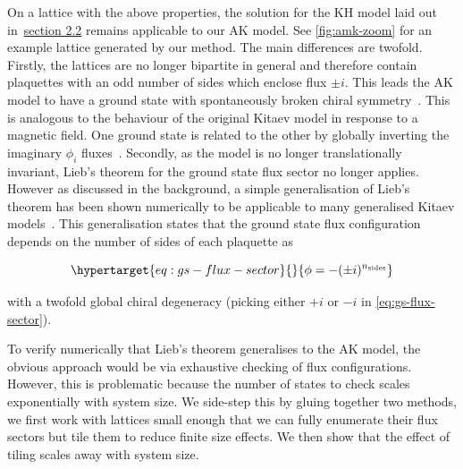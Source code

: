 On a lattice with the above properties, the solution for the KH model laid out in~\protect\hyperlink{bg-hkm-model}{section 2.2} remains applicable to our AK model. See \cref{fig:amk-zoom} for an example lattice generated by our method. The main differences are twofold. Firstly, the lattices are no longer bipartite in general and therefore contain plaquettes with an odd number of sides which enclose flux \(\pm i\). This leads the AK model to have a ground state with spontaneously broken chiral symmetry~\autocite{Chua2011,yaoExactChiralSpin2007,ChuaPRB2011,Fiete2012,Natori2016,Wu2009,Peri2020,WangHaoranPRB2021}. This is analogous to the behaviour of the original Kitaev model in response to a magnetic field. One ground state is related to the other by globally inverting the imaginary \(\phi_i\) fluxes~\autocite{yaoExactChiralSpin2007}. Secondly, as the model is no longer translationally invariant, Lieb's theorem for the ground state flux sector no longer applies. However as discussed in the background, a simple generalisation of Lieb's theorem has been shown numerically to be applicable to many generalised Kitaev models~\autocite{eschmannThermodynamicClassificationThreedimensional2020,Yao2009,eschmann2019thermodynamics,Peri2020}. This generalisation states that the ground state flux configuration depends on the number of sides of each plaquette as

\begin{equation}\protect\hypertarget{eq:gs-flux-sector}{}{\phi = -(\pm i)^{n_{\mathrm{sides}}}}\label{eq:gs-flux-sector}\end{equation}

with a twofold global chiral degeneracy (picking either \(+i\) or \(-i\) in \cref{eq:gs-flux-sector}).

To verify numerically that Lieb's theorem generalises to the AK model, the obvious approach would be via exhaustive checking of flux configurations. However, this is problematic because the number of states to check scales exponentially with system size. We side-step this by gluing together two methods, we first work with lattices small enough that we can fully enumerate their flux sectors but tile them to reduce finite size effects. We then show that the effect of tiling scales away with system size.

